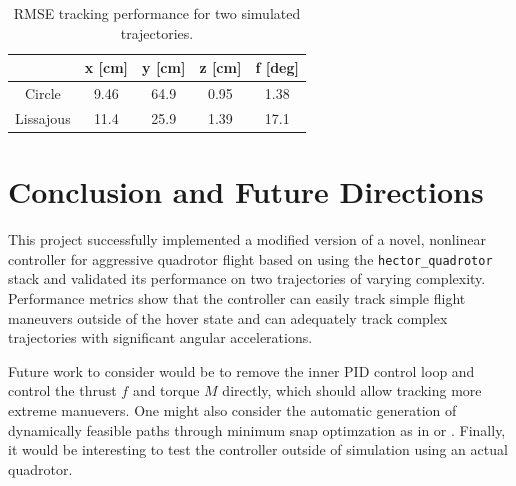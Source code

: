 \documentclass[paper=letter, fontsize=11pt]{scrartcl} %
\numberwithin{equation}{section} %
\numberwithin{figure}{section} %
\numberwithin{table}{section} %
\begin{document}
\pagebreak
\begin{table}[b]
\centering
\begin{tabular}[h]{|c|c|c|c|c|}
  \hline
   & x [cm] & y [cm] & z [cm] & f [deg] \\
  \hline
  Circle & 9.46 & 64.9 & 0.95 & 1.38 \\
  \hline
  Lissajous & 11.4 & 25.9 & 1.39 & 17.1 \\
  \hline
\end{tabular}
\caption{RMSE tracking performance for two simulated trajectories.}
\label{table:metrics}
\end{table}

\section{Conclusion and Future Directions}
This project successfully implemented a modified version of a novel, nonlinear
controller for aggressive quadrotor flight based on \cite{lee2010geometric}
using the \texttt{hector\_quadrotor} stack and
validated its performance on two trajectories of varying complexity.
Performance metrics show that the controller can easily track simple flight
maneuvers outside of the hover state and can adequately track complex trajectories
with significant angular accelerations.

Future work to consider would be to remove the inner PID control loop and
control the thrust $f$ and torque $M$ directly, which should allow tracking
more extreme manuevers. One might also consider the automatic generation of
dynamically feasible paths through minimum snap optimzation as in
\cite{mellinger2011minimum} or \cite{richter2013polynomial}. Finally, it would be
interesting to test the controller outside of simulation using an actual quadrotor.

\clearpage
{}

\end{document}
